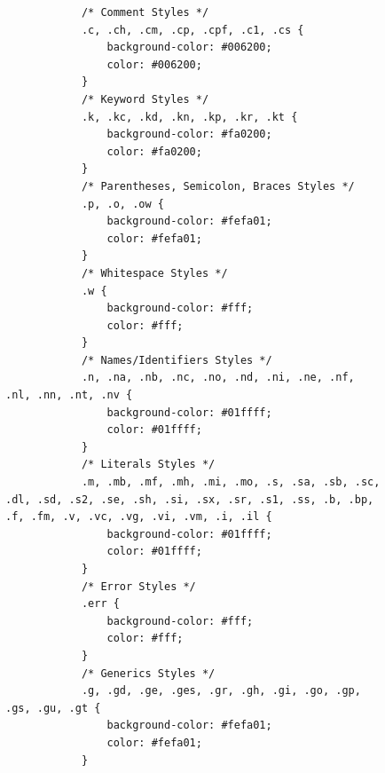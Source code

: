 \documentclass[%
class=scrreprt,
chapterprefix=false,%
open=right,%
twoside=false,%
paper=a4,%
logofile={Logo\_zentral\_farbig\_EN.png},%
thesistype=master,%
UKenglish,%
]{se2thesis}
\theoremstyle{definition}
\begin{document}
	\begin{figure}[h!]
		\begin{verbatim}
			/* Comment Styles */
			.c, .ch, .cm, .cp, .cpf, .c1, .cs {
				background-color: #006200;
				color: #006200;
			}
			/* Keyword Styles */
			.k, .kc, .kd, .kn, .kp, .kr, .kt {
				background-color: #fa0200;
				color: #fa0200;
			}
			/* Parentheses, Semicolon, Braces Styles */
			.p, .o, .ow {
				background-color: #fefa01;
				color: #fefa01;
			}
			/* Whitespace Styles */
			.w {
				background-color: #fff;
				color: #fff;
			}
			/* Names/Identifiers Styles */
			.n, .na, .nb, .nc, .no, .nd, .ni, .ne, .nf, .nl, .nn, .nt, .nv {
				background-color: #01ffff;
				color: #01ffff;
			}
			/* Literals Styles */
			.m, .mb, .mf, .mh, .mi, .mo, .s, .sa, .sb, .sc, .dl, .sd, .s2, .se, .sh, .si, .sx, .sr, .s1, .ss, .b, .bp, .f, .fm, .v, .vc, .vg, .vi, .vm, .i, .il {
				background-color: #01ffff;
				color: #01ffff;
			}
			/* Error Styles */
			.err {
				background-color: #fff;
				color: #fff;
			}
			/* Generics Styles */
			.g, .gd, .ge, .ges, .gr, .gh, .gi, .go, .gp, .gs, .gu, .gt {
				background-color: #fefa01;
				color: #fefa01;
			}
		\end{verbatim}
		\label{lst:model-visual-css}
	\end{figure}
	
\end{document}
